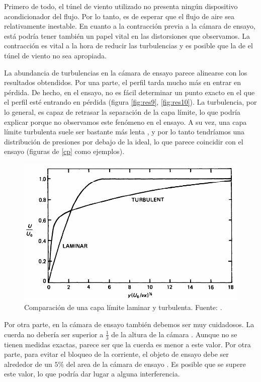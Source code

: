 \documentclass{article}
\begin{document}
Primero de todo, el túnel de viento utilizado no presenta ningún dispositivo acondicionador del flujo. Por lo tanto, es de esperar
que el flujo de aire sea relativamente inestable. En cuanto a la contracción previa a la cámara de ensayo, está podría tener 
también un papel vital en las distorsiones que observamos. La contracción es vital a la hora de reducir las turbulencias 
\cite{Derbunovich1987} y es posible que la de el túnel de viento no sea apropiada. 

La abundancia de turbulencias en la cámara de ensayo parece alinearse con los resultados obtendidos. Por una parte, el perfil 
tarda mucho más en entrar en pérdida. De hecho, en el ensayo, no es fácil determinar un punto exacto en el que el perfil esté 
entrando en pérdida (figura \ref{fig:res9}, \ref{fig:res10}). La turbulencia, por lo general, es capaz de retrasar la separación 
de la capa límite, lo que podría explicar porque no observamos este fenómeno en el ensayo. A su vez, una capa límite turbulenta suele 
ser bastante más lenta \cite[Capítulo 21.5]{Tritton1988-ei}, y por lo tanto tendríamos una distribución de presiones por debajo de la ideal, lo que parece coincidir 
con el ensayo (figuras de \ref{cp} como ejemplos).

\begin{figure}[h!]
    \centering
    \includegraphics[scale=0.7]{captura.png}
    \caption{Comparación de una capa límite laminar y turbulenta. Fuente: \cite[Capítulo 21.5]{Tritton1988-ei}.}
    \label{fig:capturon}    
\end{figure}

Por otra parte, en la cámara de ensayo también debemos ser muy cuidadosos. La cuerda no debería ser superior a 
$\frac{1}{3}$ de la altura de la cámara \cite{Barlow1999-wm}. Aunque no se tienen medidas exactas, 
parece ser que la cuerda es menor a este valor. 
Por otra parte, para evitar el bloqueo de la corriente, el objeto de ensayo debe ser alrededor de un $5\%$ del area 
de la cámara de ensayo \cite{Barlow1999-wm}. Es posible que se supere este valor, lo que podría dar lugar a alguna interferencia.
\end{document}
